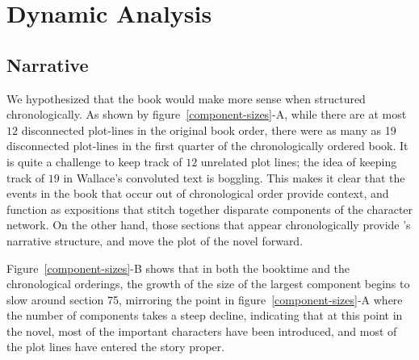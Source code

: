 \section{Dynamic Analysis}

\subsection{Narrative}

We hypothesized that the book would make more sense when structured chronologically. As shown by figure~\ref{component-sizes}-A, while there are at most $12$ disconnected plot-lines in the original book order, there were as many as 19 disconnected plot-lines in the first quarter of the chronologically ordered book. It is quite a challenge to keep track of $12$ unrelated plot lines; the idea of keeping track of $19$ in Wallace's convoluted text is boggling. This makes it clear that the events in the book that occur out of chronological order provide context, and function as expositions that stitch together disparate components of the character network. On the other hand, those sections that appear chronologically provide \infinitejest's narrative structure, and move the plot of the novel forward.

Figure~\ref{component-sizes}-B shows that in both the booktime and the chronological orderings, the growth of the size of the largest component begins to slow around section 75, mirroring the point in figure~\ref{component-sizes}-A where the number of components takes a steep decline, indicating that at this point in the novel, most of the important characters have been introduced, and most of the plot lines have entered the story proper.

